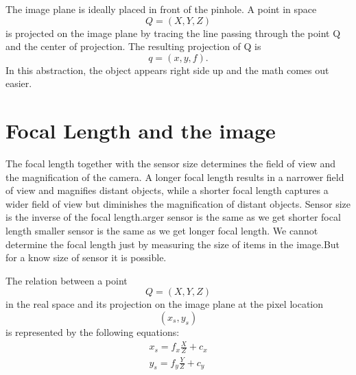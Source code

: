 \documentclass{article}
\begin{document}
The image plane is ideally placed in front of the pinhole. A point in space
\begin{equation}
    Q = (X, Y, Z)
\end{equation}
is projected on the image plane by tracing the line passing through the point Q and the center of projection. The resulting projection of Q is
\begin{equation}
    q = (x,y,f).
\end{equation}
In this abstraction, the object appears right side up and the math comes out easier.

\section{Focal Length and the image}

The focal length together with the sensor size determines the field of view and the magnification of the camera. A longer focal length results in a narrower field of view and magnifies distant objects, while a shorter focal length captures a wider field of view but diminishes the magnification of distant objects. Sensor size is the inverse of the focal length.arger sensor is the same as we get shorter focal length smaller sensor is the same as we get longer focal length. We cannot determine the focal length just by measuring the size of items in the image.But for a know size of sensor it is possible.

The relation between a point \begin{equation}
    Q=(X, Y, Z)
\end{equation}in the real space and its projection on the image plane at the pixel location \begin{equation}
    (x_s, y_s)
\end{equation} is represented by the following equations:
\begin{eqnarray}
    x_s=f_x\frac{X}{Z}+c_x \\
    y_s=f_y\frac{Y}{Z}+c_y
\end{eqnarray}
\end{document}
